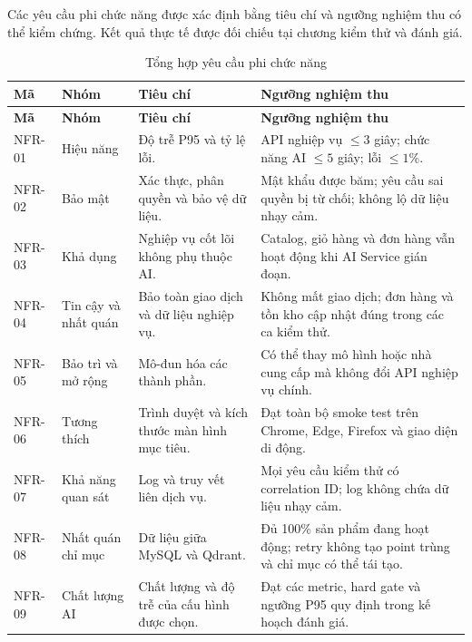 Các yêu cầu phi chức năng được xác định bằng tiêu chí và ngưỡng nghiệm thu có thể
kiểm chứng. Kết quả thực tế được đối chiếu tại chương kiểm thử và đánh giá.
\begingroup
\footnotesize
\setlength{\LTpre}{0pt}
\setlength{\LTpost}{0pt}
\captionsetup{skip=4pt}
\begin{longtable}{|p{}|p{}|p{}|p{}|}
    \caption{Tổng hợp yêu cầu phi chức năng}
    \label{tab:non-functional-requirements}\\
    \hline
    \textbf{Mã} & \textbf{Nhóm} & \textbf{Tiêu chí} & \textbf{Ngưỡng nghiệm thu} \\ \hline
    \endfirsthead
    \hline
    \textbf{Mã} & \textbf{Nhóm} & \textbf{Tiêu chí} & \textbf{Ngưỡng nghiệm thu} \\ \hline
    \endhead
    NFR-01 & Hiệu năng & Độ trễ P95 và tỷ lệ lỗi. & API nghiệp vụ $\leq 3$ giây; chức năng AI $\leq 5$ giây; lỗi $\leq 1\%$. \\ \hline
    NFR-02 & Bảo mật & Xác thực, phân quyền và bảo vệ dữ liệu. & Mật khẩu được băm; yêu cầu sai quyền bị từ chối; không lộ dữ liệu nhạy cảm. \\ \hline
    NFR-03 & Khả dụng & Nghiệp vụ cốt lõi không phụ thuộc AI. & Catalog, giỏ hàng và đơn hàng vẫn hoạt động khi AI Service gián đoạn. \\ \hline
    NFR-04 & Tin cậy và nhất quán & Bảo toàn giao dịch và dữ liệu nghiệp vụ. & Không mất giao dịch; đơn hàng và tồn kho cập nhật đúng trong các ca kiểm thử. \\ \hline
    NFR-05 & Bảo trì và mở rộng & Mô-đun hóa các thành phần. & Có thể thay mô hình hoặc nhà cung cấp mà không đổi API nghiệp vụ chính. \\ \hline
    NFR-06 & Tương thích & Trình duyệt và kích thước màn hình mục tiêu. & Đạt toàn bộ smoke test trên Chrome, Edge, Firefox và giao diện di động. \\ \hline
    NFR-07 & Khả năng quan sát & Log và truy vết liên dịch vụ. & Mọi yêu cầu kiểm thử có correlation ID; log không chứa dữ liệu nhạy cảm. \\ \hline
    NFR-08 & Nhất quán chỉ mục & Dữ liệu giữa MySQL và Qdrant. & Đủ 100\% sản phẩm đang hoạt động; retry không tạo point trùng và chỉ mục có thể tái tạo. \\ \hline
    NFR-09 & Chất lượng AI & Chất lượng và độ trễ của cấu hình được chọn. & Đạt các metric, hard gate và ngưỡng P95 quy định trong kế hoạch đánh giá. \\ \hline
\end{longtable}
\endgroup

